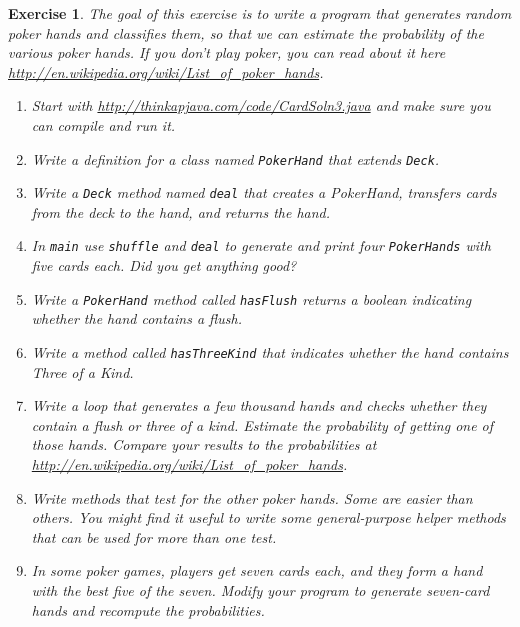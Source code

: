 \documentclass[12pt]{book}
\theoremstyle{exercise}
\newtheorem{exercise}{Exercise}[chapter]
\newcommand{\java}[1]{\lstinline{#1}} %
\begin{document}
\begin{exercise}
The goal of this exercise is to write a program that generates random poker hands and classifies them, so that we can estimate the
probability of the various poker hands.
If you don't play poker, you can read about it here \url{http://en.wikipedia.org/wiki/List_of_poker_hands}.

\begin{enumerate}

\item Start with \url{http://thinkapjava.com/code/CardSoln3.java} and make sure you can compile and run it.

\item Write a definition for a class named \java{PokerHand} that extends \java{Deck}.

\item Write a \java{Deck} method named \java{deal} that creates a PokerHand, transfers cards from the deck to the hand, and returns the hand.

\item In \java{main} use \java{shuffle} and \java{deal} to generate and print four \java{PokerHands} with five cards each.
Did you get anything good?

\item Write a \java{PokerHand} method called \java{hasFlush} returns a boolean indicating whether the hand contains a flush.

\item Write a method called \java{hasThreeKind} that indicates whether the hand contains Three of a Kind.

\item Write a loop that generates a few thousand hands and checks whether they contain a flush or three of a kind.
Estimate the probability of getting one of those hands.
Compare your results to the probabilities at \url{http://en.wikipedia.org/wiki/List_of_poker_hands}.

\item Write methods that test for the other poker hands.
Some are easier than others.
You might find it useful to write some general-purpose helper methods that can be used for more than one test.

\item In some poker games, players get seven cards each, and they form a hand with the best five of the seven.
Modify your program to generate seven-card hands and recompute the probabilities.

\end{enumerate}
\end{exercise}
\end{document}
